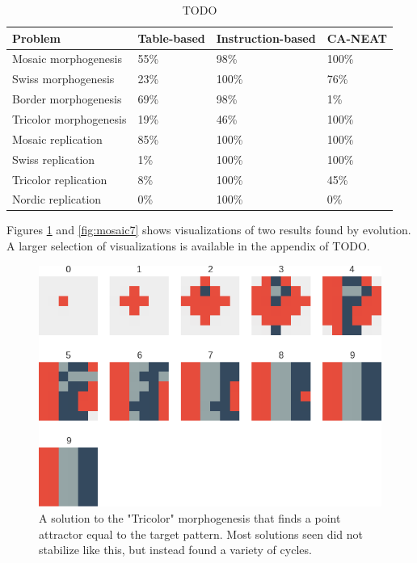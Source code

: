 \begin{table}
    \centering
    \caption{TODO}
    \begin{tabular}{llll}
    \hline
    Problem                & Table-based & Instruction-based & CA-NEAT \\ \hline
    Mosaic morphogenesis   & 55\%        & 98\%              & 100\%   \\
    Swiss morphogenesis    & 23\%        & 100\%             & 76\%    \\
    Border morphogenesis   & 69\%        & 98\%              & 1\%     \\
    Tricolor morphogenesis & 19\%        & 46\%              & 100\%   \\
    Mosaic replication     & 85\%        & 100\%             & 100\%   \\
    Swiss replication      & 1\%         & 100\%             & 100\%   \\
    Tricolor replication   & 8\%         & 100\%             & 45\%    \\
    Nordic replication     & 0\%         & 100\%             & 0\%     \\ \hline
    \end{tabular}
\end{table}


Figures \ref{fig:tricolor_point_attractor} and \ref{fig:mosaic7} shows visualizations of two results found by evolution.
A larger selection of visualizations is available in the appendix of TODO.

\begin{figure}[h]
\centering
\includegraphics[height=0.4\textheight, width=\textwidth, keepaspectratio]{fig/result_figs/generate_tricolor/1}
\caption[A solution to the "Tricolor" morphogenesis]{A solution to the "Tricolor" morphogenesis that finds a point attractor equal to the target pattern.
Most solutions seen did not stabilize like this, but instead found a variety of cycles.}
\label{fig:tricolor_point_attractor}
\end{figure}

